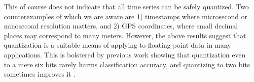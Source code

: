 This of course does not indicate that all time series can be safely quantized. Two counterexamples of which we are aware are 1) timestamps where microsecond or nanosecond resolution matters, and 2) GPS coordinates, where small decimal places may correspond to many meters. However, the above results suggest that quantization is a suitable means of applying \minesp to floating-point data in many applications. This is bolstered by previous work showing that quantization even to a mere six bits \cite{epenthesis} rarely harms classification accuracy, and quantizing to two bits sometimes improves it \cite{sax}.







